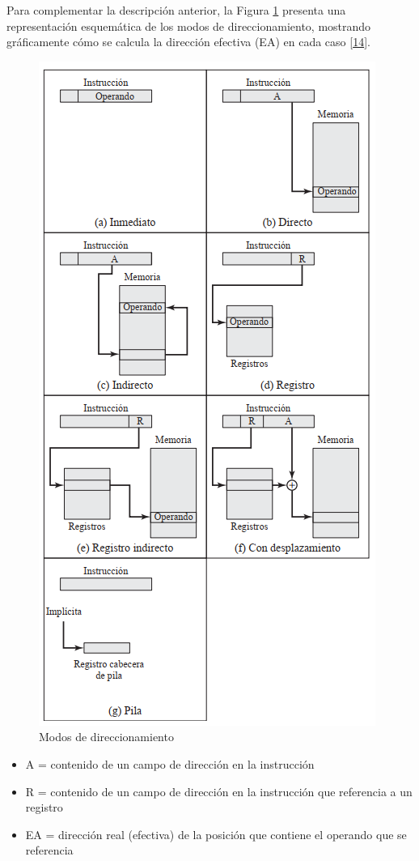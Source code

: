 \documentclass[12pt,oneside]{templates/unerthesis}
\providecommand{\tightlist}{%
  \setlength{\itemsep}{0pt}\setlength{\parskip}{0pt}}
\begin{document}
Para complementar la descripción anterior, la Figura \ref{fig:ModDir} presenta una representación esquemática de los modos de direccionamiento, mostrando gráficamente cómo se calcula la dirección efectiva (EA) en cada caso \protect\hyperlink{ref-stallings_computer_2021}{{[}14{]}}.

\begin{figure}

{\centering \includegraphics[width=0.6\linewidth]{images/modosdireccionamiento} 

}

\caption{Modos de direccionamiento }\label{fig:ModDir}
\end{figure}

\begin{itemize}
\tightlist
\item
  A = contenido de un campo de dirección en la instrucción
\item
  R = contenido de un campo de dirección en la instrucción que referencia a un registro
\item
  EA = dirección real (efectiva) de la posición que contiene el operando que se referencia
\end{itemize}
\end{document}
